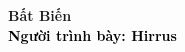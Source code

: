 \begin{frame}[noframenumbering]
    \thispagestyle{empty}
    \bfseries
    \begin{flushleft}
        \vfill
        \vspace{5mm}
        \textcolor{BlueDefault}{\huge \bfseries Bất Biến} \\
        \vspace{8mm}
        \textcolor{black}{\large \bfseries Người trình bày: Hirrus }
        \vfill
    \end{flushleft}
\end{frame}